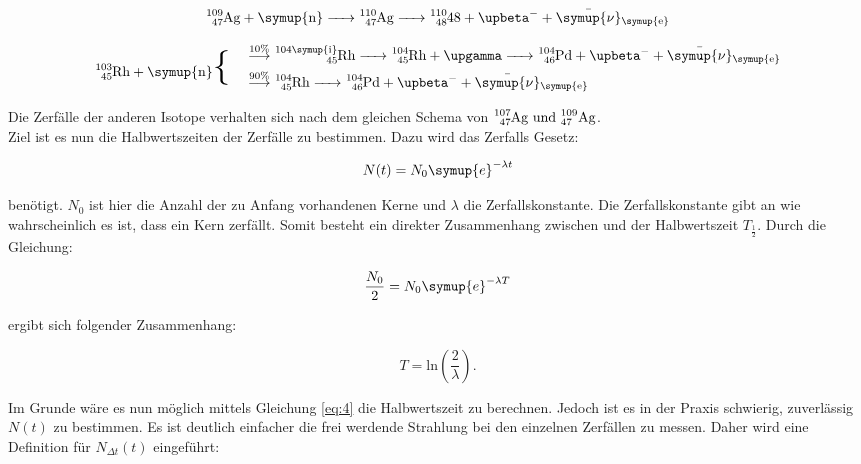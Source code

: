 \begin{equation}
   \ce{^{109}_{47}\text{Ag} + \symup{n} -> ^{110}_{47}\text{Ag} -> ^{110}_{48}\text{48} + $\upbeta$^- + \bar{\symup{\nu}}_{\symup{e}}}
    \label{eq:Ag109} 
\end{equation}

\begin{equation}
   \begin{split}
      \ce{^{103}_{45}\text{Rh} + \symup{n}} \mathbin{\scalebox{2.5} \textbraceleft } \quad
   \end{split}
   \begin{split}
      &\overset{10\%}{\longrightarrow} \ce{^{104\symup{i}}_{45}\text{Rh} -> ^{104}_{45}\text{Rh} + $\upgamma$ -> ^{104}_{46}\text{Pd} + $\upbeta$^- + \bar{\symup{\nu}}_{\symup{e}} } \\
      &\overset{90\%}{\longrightarrow} \ce{^{104}_{45}\text{Rh} -> ^{104}_{46}\text{Pd} + $\upbeta$^- +\bar{\symup{\nu}}_{\symup{e}} } \\
   \end{split}
   \label{eq:Rh103}
\end{equation}

\noindent Die Zerfälle der anderen Isotope verhalten sich nach dem gleichen Schema von $\ce{^{107}_{47}\text{Ag und }^{109}_{47}\text{Ag}}$.\\
Ziel ist es nun die Halbwertszeiten der Zerfälle zu bestimmen. Dazu wird das Zerfalls Gesetz:

\begin{equation}
   N(t) = N_0 \symup{e}^{- \lambda t} 
   \label{eq:4}
\end{equation}

\noindent benötigt. $N_0$ ist hier die Anzahl der zu Anfang vorhandenen Kerne und $\lambda$ die Zerfallskonstante. Die Zerfallskonstante gibt an 
wie wahrscheinlich es ist, dass ein Kern zerfällt. Somit besteht ein direkter Zusammenhang zwischen \lambda und der Halbwertszeit $T_\frac{1}{2}$.
Durch die Gleichung:

\begin{equation*}
   \frac{N_0}{2} = N_0 \symup{e}^{- \lambda T} 
\end{equation*}

\noindent ergibt sich folgender Zusammenhang:

\begin{equation*}
   T = \text{ln}\left(\frac{2}{\lambda}\right) . \nonumber
\end{equation*}

\noindent Im Grunde wäre es nun möglich mittels Gleichung \ref{eq:4} die Halbwertszeit zu berechnen. Jedoch ist es in der Praxis schwierig, 
zuverlässig $N(t)$ zu bestimmen. Es ist deutlich einfacher die frei werdende Strahlung bei den einzelnen Zerfällen zu messen.
Daher wird eine Definition für $N_{\Delta t}(t)$ eingeführt:

